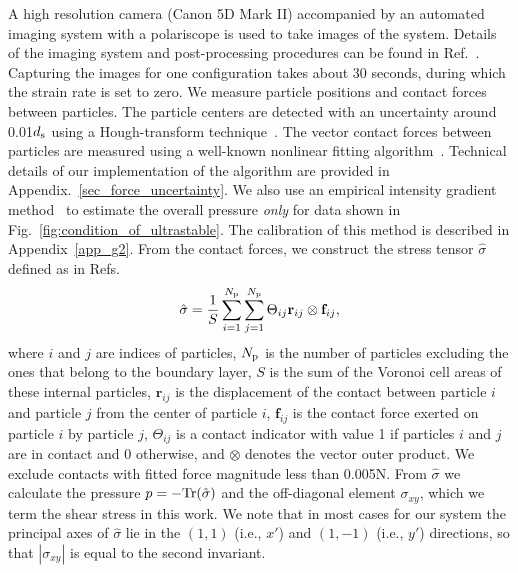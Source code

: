 \documentclass[twocolumn,showkeys,superscriptaddress,preprintnumbers,amsmath,amssymb,showpacs,prx,longbibliography]{revtex4-2}
\begin{document}
\begin{CJK*}{UTF8}{gbsn}
A high resolution camera (Canon 5D Mark II) accompanied by an automated imaging system with a polariscope is used to take images of the system. Details of the imaging system and post-processing procedures can be found in Ref.~\cite{wang2018_phd}. Capturing the images for one configuration takes about 30 seconds, during which the strain rate is set to zero. We measure particle positions and contact forces between particles. The particle centers are detected with an uncertainty around 0.01$d_{\rm s}$ using a Hough-transform technique~\cite{peng2007_JCISE,Ren2013_prl}. The vector contact forces between particles are measured using a well-known nonlinear fitting algorithm~\cite{majmudar2005_nature,Daniels2017_rsi,zadeh2019_gm}. Technical details of our implementation of the algorithm are provided in  Appendix.~\ref{sec_force_uncertainty}.  We also use an empirical intensity gradient method~\cite{Howell1999_prl,zadeh2019_gm,zhao2019_njp} to estimate the overall pressure {\it only} for data shown in Fig.~\ref{fig:condition_of_ultrastable}. The calibration of this method is described in Appendix~\ref{app_g2}. From the contact forces, we construct the stress tensor $\hat{\sigma}$ defined as in Refs.~\cite{christoffersen1981_jam,radjai1998_prl,Bi2011_nat} 
\begin{equation}\label{eq:stress_tensor}
    \hat{\sigma} = \frac{1}{S}\sum_{i=1}^{N_{\rm p}}\sum_{j=1}^{N_{\rm p}}\Theta_{ij}\mathbf{r}_{ij}\otimes \mathbf{f}_{ij},
\end{equation}
where $i$ and $j$ are indices of particles, $N_{\rm p}$ is the number of particles excluding the ones that belong to the boundary layer, $S$ is the sum of the Voronoi cell areas of these internal particles, $\mathbf{r}_{ij}$ is the displacement of the contact between particle $i$ and particle $j$ from the center of particle $i$, $\mathbf{f}_{ij}$ is the contact force exerted on particle $i$ by particle $j$, $\Theta_{ij}$ is a contact indicator with value 1 if particles $i$ and $j$ are in contact and 0 otherwise, and $\otimes$ denotes the vector outer product. We exclude contacts with fitted force magnitude less than 0.005N. From $\hat{\sigma}$ we calculate the pressure $p=-{\rm Tr}(\hat{\sigma})$ and the off-diagonal element $\sigma_{xy}$, which we term the shear stress in this work. We note that in most cases for our system the principal axes of $\hat{\sigma}$ lie in the $(1,1)$ (i.e., $x'$) and $(1,-1)$ (i.e., $y'$) directions, so that $|\sigma_{xy}|$ is equal to the second invariant. 




\end{CJK*}
\end{document}
